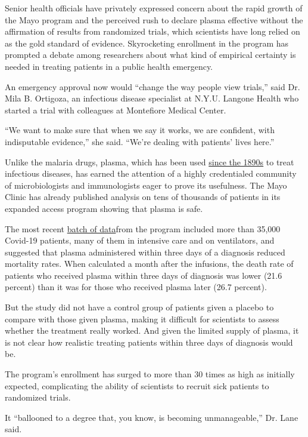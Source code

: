 Senior health officials have privately expressed concern about the rapid
growth of the Mayo program and the perceived rush to declare plasma
effective without the affirmation of results from randomized trials,
which scientists have long relied on as the gold standard of evidence.
Skyrocketing enrollment in the program has prompted a debate among
researchers about what kind of empirical certainty is needed in treating
patients in a public health emergency.

An emergency approval now would ``change the way people view trials,''
said Dr. Mila B. Ortigoza, an infectious disease specialist at N.Y.U.
Langone Health who started a trial with colleagues at Montefiore Medical
Center.

``We want to make sure that when we say it works, we are confident, with
indisputable evidence,'' she said. ``We're dealing with patients' lives
here.''

Unlike the malaria drugs, plasma, which has been used
\href{https://www.ncbi.nlm.nih.gov/pmc/articles/PMC4781783/}{since the
1890s} to treat infectious diseases, has earned the attention of a
highly credentialed community of microbiologists and immunologists eager
to prove its usefulness. The Mayo Clinic has already published analysis
on tens of thousands of patients in its expanded access program showing
that plasma is safe.

The most recent
\href{https://www.medrxiv.org/content/10.1101/2020.08.12.20169359v1}{batch
of data}from the program included more than 35,000 Covid-19 patients,
many of them in intensive care and on ventilators, and suggested that
plasma administered within three days of a diagnosis reduced mortality
rates. When calculated a month after the infusions, the death rate of
patients who received plasma within three days of diagnosis was lower
(21.6 percent) than it was for those who received plasma later (26.7
percent).

But the study did not have a control group of patients given a placebo
to compare with those given plasma, making it difficult for scientists
to assess whether the treatment really worked. And given the limited
supply of plasma, it is not clear how realistic treating patients within
three days of diagnosis would be.

The program's enrollment has surged to more than 30 times as high as
initially expected, complicating the ability of scientists to recruit
sick patients to randomized trials.

It ``ballooned to a degree that, you know, is becoming unmanageable,''
Dr. Lane said.

